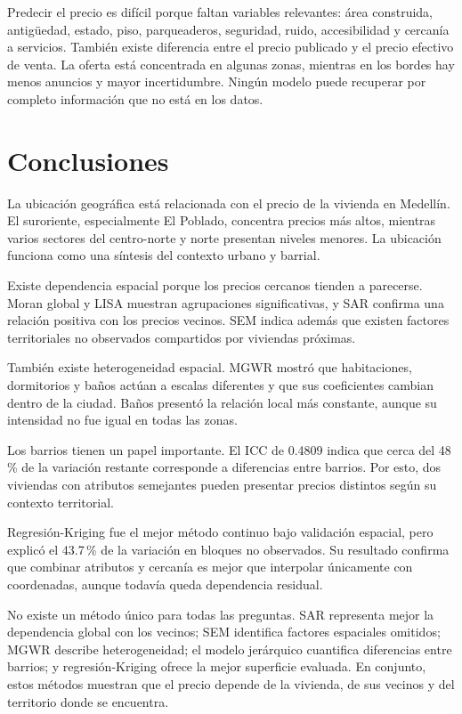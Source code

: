 \documentclass[conference]{IEEEtran}
\begin{document}
Predecir el precio es difícil porque faltan variables relevantes: área construida, antigüedad, estado, piso, parqueaderos, seguridad, ruido, accesibilidad y cercanía a servicios. También existe diferencia entre el precio publicado y el precio efectivo de venta. La oferta está concentrada en algunas zonas, mientras en los bordes hay menos anuncios y mayor incertidumbre. Ningún modelo puede recuperar por completo información que no está en los datos.

\section{Conclusiones}

La ubicación geográfica está relacionada con el precio de la vivienda en Medellín. El suroriente, especialmente El Poblado, concentra precios más altos, mientras varios sectores del centro-norte y norte presentan niveles menores. La ubicación funciona como una síntesis del contexto urbano y barrial.

Existe dependencia espacial porque los precios cercanos tienden a parecerse. Moran global y LISA muestran agrupaciones significativas, y SAR confirma una relación positiva con los precios vecinos. SEM indica además que existen factores territoriales no observados compartidos por viviendas próximas.

También existe heterogeneidad espacial. MGWR mostró que habitaciones, dormitorios y baños actúan a escalas diferentes y que sus coeficientes cambian dentro de la ciudad. Baños presentó la relación local más constante, aunque su intensidad no fue igual en todas las zonas.

Los barrios tienen un papel importante. El ICC de 0.4809 indica que cerca del 48\,\% de la variación restante corresponde a diferencias entre barrios. Por esto, dos viviendas con atributos semejantes pueden presentar precios distintos según su contexto territorial.

Regresión-Kriging fue el mejor método continuo bajo validación espacial, pero explicó el 43.7\,\% de la variación en bloques no observados. Su resultado confirma que combinar atributos y cercanía es mejor que interpolar únicamente con coordenadas, aunque todavía queda dependencia residual.

No existe un método único para todas las preguntas. SAR representa mejor la dependencia global con los vecinos; SEM identifica factores espaciales omitidos; MGWR describe heterogeneidad; el modelo jerárquico cuantifica diferencias entre barrios; y regresión-Kriging ofrece la mejor superficie evaluada. En conjunto, estos métodos muestran que el precio depende de la vivienda, de sus vecinos y del territorio donde se encuentra.
\end{document}

